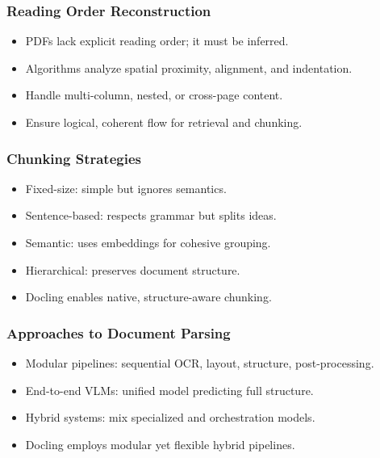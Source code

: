 \begin{frame}[fragile]\frametitle{Reading Order Reconstruction}
      \begin{itemize}
        \item PDFs lack explicit reading order; it must be inferred.
        \item Algorithms analyze spatial proximity, alignment, and indentation.
        \item Handle multi-column, nested, or cross-page content.
        \item Ensure logical, coherent flow for retrieval and chunking.
      \end{itemize}
\end{frame}

\begin{frame}[fragile]\frametitle{Chunking Strategies}
      \begin{itemize}
        \item Fixed-size: simple but ignores semantics.
        \item Sentence-based: respects grammar but splits ideas.
        \item Semantic: uses embeddings for cohesive grouping.
        \item Hierarchical: preserves document structure.
        \item Docling enables native, structure-aware chunking.
      \end{itemize}
\end{frame}

\begin{frame}[fragile]\frametitle{Approaches to Document Parsing}
      \begin{itemize}
        \item Modular pipelines: sequential OCR, layout, structure, post-processing.
        \item End-to-end VLMs: unified model predicting full structure.
        \item Hybrid systems: mix specialized and orchestration models.
        \item Docling employs modular yet flexible hybrid pipelines.
      \end{itemize}
\end{frame}

